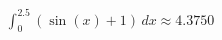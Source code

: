 \documentclass[preview]{standalone}
\begin{document}
\begin{align*}
\int_{0}^{2.5} \left(\sin(x) + 1\right) \, dx \approx 4.3750
\end{align*}
\end{document}
